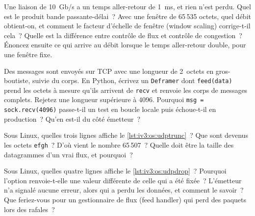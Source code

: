 \begin{question}\label{iq:iv3:operating-systems-concurrency-and-networks:22}
Une liaison de 10~Gb/s a un temps aller-retour de 1~ms, et rien n'est perdu. Quel est le produit bande passante-délai~? Avec une fenêtre de 65\,535 octets, quel débit obtient-on, et comment le facteur d'échelle de fenêtre (window scaling) corrige-t-il cela~? Quelle est la différence entre contrôle de flux et contrôle de congestion~? Énoncez ensuite ce qui arrive au débit lorsque le temps aller-retour double, pour une fenêtre fixe.
\end{question}

\begin{question}\label{iq:iv3:operating-systems-concurrency-and-networks:23}
Des messages sont envoyés sur TCP avec une longueur de 2~octets en gros-boutiste, suivie du corps. En Python, écrivez un \texttt{Deframer} dont \texttt{feed(data)} prend les octets à mesure qu'ils arrivent de \texttt{recv} et renvoie les corps de messages complets. Rejetez une longueur supérieure à 4096. Pourquoi \texttt{msg = sock.recv(4096)} passe-t-il un test en boucle locale puis échoue-t-il en production~? Qu'en est-il du côté émetteur~?
\end{question}

\begin{question}\label{iq:iv3:operating-systems-concurrency-and-networks:24}
Sous Linux, quelles trois lignes affiche le \cref{lst:iv3:os:udptrunc}~? Que sont devenus les octets \texttt{efgh}~? D'où vient le nombre 65\,507~? Quelle doit être la taille des datagrammes d'un vrai flux, et pourquoi~?
\label{lst:iv3:os:udptrunc}
\end{question}

\begin{question}\label{iq:iv3:operating-systems-concurrency-and-networks:25}
Sous Linux, quelles quatre lignes affiche le \cref{lst:iv3:os:udpdrop}~? Pourquoi l'option renvoie-t-elle une valeur différente de celle qui a été fixée~? L'émetteur n'a signalé aucune erreur, alors qui a perdu les données, et comment le savoir~? Que feriez-vous pour un gestionnaire de flux (feed handler) qui perd des paquets lors des rafales~?
\label{lst:iv3:os:udpdrop}
\end{question}

